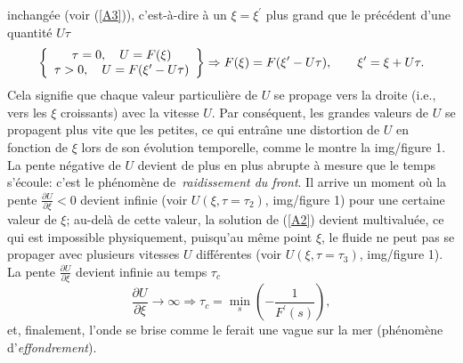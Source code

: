 \documentclass[10pt,thmsa]{article}
\begin{document}
inchang\'{e}e (voir (\ref{A3})), c'est-\`{a}-dire \`{a} un $\xi=\xi^{\prime}$
plus grand que le pr\'{e}c\'{e}dent d'une quantit\'{e} $U\tau$%
\begin{equation}
\left\{
\begin{array}
[c]{c}%
\tau=0,\quad U=F(\xi)\\
\tau>0,\quad U=F(\xi^{\prime}-U\tau)
\end{array}
\right\}  \Rightarrow F(\xi)=F(\xi^{\prime}-U\tau),\qquad\xi^{\prime}%
=\xi+U\tau.\label{A8}%
\end{equation}
Cela signifie que chaque valeur particuli\`{e}re de $U$ se propage vers la
droite (i.e., vers les $\xi$ croissants) avec la vitesse $U$. Par
cons\'{e}quent, les grandes valeurs de $U$ se propagent plus vite que les
petites, ce qui entra\^{\i}ne une distortion de $U$ en fonction de $\xi$ lors
de son \'{e}volution temporelle, comme le montre la img/figure 1. La pente
n\'{e}gative de $U$ devient de plus en plus abrupte \`{a} mesure que le temps
s'\'{e}coule: c'est le ph\'{e}nom\`{e}ne de\textit{\ raidissement du front}.
Il arrive un moment o\`{u} la pente $\frac{\partial U}{\partial\xi}<0$ devient
infinie (voir $U(\xi,\tau=\tau_{2})$, img/figure 1) pour une certaine valeur de
$\xi$; au-del\`{a} de cette valeur, la solution de (\ref{A2}) devient
multivalu\'{e}e, ce qui est impossible physiquement, puisqu'au m\^{e}me point
$\xi$, le fluide ne peut pas se propager avec plusieurs vitesses $U $
diff\'{e}rentes (voir $U(\xi,\tau=\tau_{3})$, img/figure 1). La pente
$\frac{\partial U}{\partial\xi}$ devient infinie au temps $\tau_{c}$
\begin{equation}
\frac{\partial U}{\partial\xi}\rightarrow\infty\Rightarrow\tau_{c}=\min
_{s}\left(  -\frac{1}{F^{\prime}(s)}\right)  ,\label{A9}%
\end{equation}
et, finalement, l'onde se brise comme le ferait une vague sur la mer
(ph\'{e}nom\`{e}ne d'\textit{effondrement}).
\end{document}
